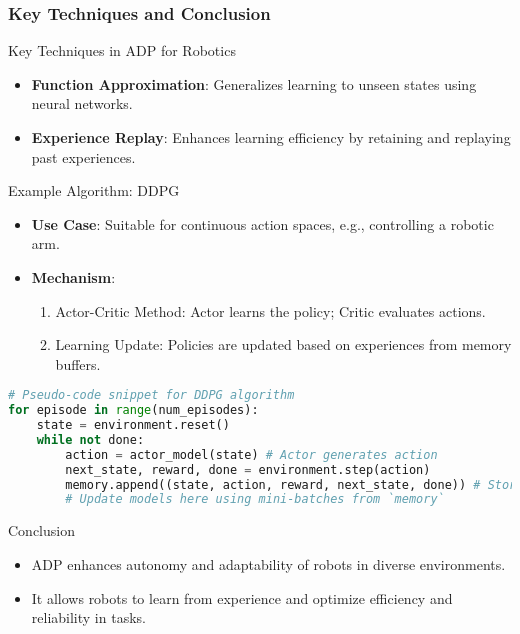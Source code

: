 \documentclass[aspectratio=169]{beamer}
\begin{document}
\begin{frame}[fragile]
    \frametitle{Key Techniques and Conclusion}
    \begin{block}{Key Techniques in ADP for Robotics}
        \begin{itemize}
            \item \textbf{Function Approximation}: Generalizes learning to unseen states using neural networks.
            \item \textbf{Experience Replay}: Enhances learning efficiency by retaining and replaying past experiences.
        \end{itemize}
    \end{block}
    
    \begin{block}{Example Algorithm: DDPG}
        \begin{itemize}
            \item \textbf{Use Case}: Suitable for continuous action spaces, e.g., controlling a robotic arm.
            \item \textbf{Mechanism}:
                \begin{enumerate}
                    \item Actor-Critic Method: Actor learns the policy; Critic evaluates actions.
                    \item Learning Update: Policies are updated based on experiences from memory buffers.
                \end{enumerate}
        \end{itemize}
        
        \begin{lstlisting}[language=Python]
# Pseudo-code snippet for DDPG algorithm
for episode in range(num_episodes):
    state = environment.reset()
    while not done:
        action = actor_model(state) # Actor generates action
        next_state, reward, done = environment.step(action)
        memory.append((state, action, reward, next_state, done)) # Store experience
        # Update models here using mini-batches from `memory`
        \end{lstlisting}
    \end{block}
    
    \begin{block}{Conclusion}
        \begin{itemize}
            \item ADP enhances autonomy and adaptability of robots in diverse environments.
            \item It allows robots to learn from experience and optimize efficiency and reliability in tasks.
        \end{itemize}
    \end{block}
\end{frame}
\end{document}
